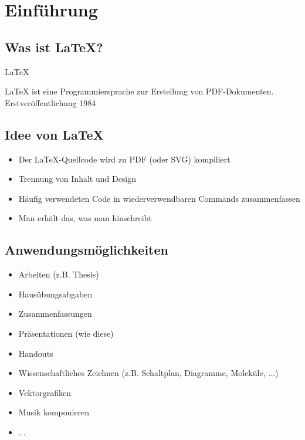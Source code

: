 \documentclass[
    ngerman,
    accentcolor=3b,
    dark_mode,
    fontsize= 12pt,
    a4paper,
    aspectratio=169,
    colorback=true,
    fancy_row_colors,
    leqno,
    fleqn,
    boxarc=3pt,
    fleqn,
]{algoslides}
\begin{document}
    \section{Einführung}\label{1}\label{Einfuehrung}
    \subsection{Was ist \LaTeX?}\label{1.1}\label{1.1}
    \begin{frame}[c]
        \slidehead{}
        \centering\fontsize{40pt}{45pt}\selectfont\LaTeX

        \medskip\normalsize{}

        \vfill
        LaTeX ist eine Programmiersprache zur Erstellung von PDF-Dokumenten. Erstveröffentlichung 1984
    \end{frame}
    \subsection{Idee von \LaTeX}\label{1.2}\label{1.2}
    \begin{frame}
        \slidehead{}
        \begin{itemize}
            \item Der \LaTeX-Quellcode wird zu PDF (oder SVG) kompiliert
            \item Trennung von Inhalt und Design
            \item Häufig verwendeten Code in wiederverwendbaren Commands zusammenfassen
            \item Man erhält  das, was man hinschreibt
        \end{itemize}
    \end{frame}
    \subsection{Anwendungsmöglichkeiten}
    \begin{frame}
        \slidehead{}
        \begin{itemize}
            \item Arbeiten (z.B. Thesis)
            \item Hausübungsabgaben
            \item Zusammenfassungen
            \item Präsentationen (wie diese)
            \item Handouts
            \item Wissenschaftliches Zeichnen (z.B. Schaltplan, Diagramme, Moleküle, $\dots$)
            \item Vektorgrafiken
            \item Musik komponieren
            \item $\dots$
        \end{itemize}
    \end{frame}
\end{document}
